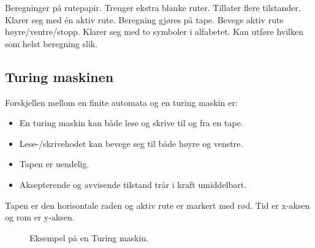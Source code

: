 \documentclass[11pt,a4paper]{article}
\begin{document}
Beregninger på rutepapir. Trenger ekstra blanke ruter. Tillater flere tilstander. Klarer seg med én aktiv rute. Beregning gjøres på tape. Bevege aktiv rute høyre/ventre/stopp. Klarer seg med to symboler i alfabetet. Kan utføre hvilken som helst beregning slik.

\subsection{Turing maskinen}
Forskjellen mellom en finite automata og en turing maskin er:
\begin{itemize}
	\item{En turing maskin kan både lese og skrive til og fra en tape.}
	\item{Lese-/skrivehodet kan bevege seg til både høyre og venstre.}
	\item{Tapen er uendelig.}
	\item{Aksepterende og avvisende tilstand trår i kraft umiddelbart.}
\end{itemize}

\begin{center}
\end{center}

Tapen er den horisontale raden og aktiv rute er markert med rød. Tid er x-aksen og rom er y-aksen.


\begin{figure}[h!]
\centering
{}
\caption{Eksempel på en Turing maskin.}
\end{figure}
\end{document}
